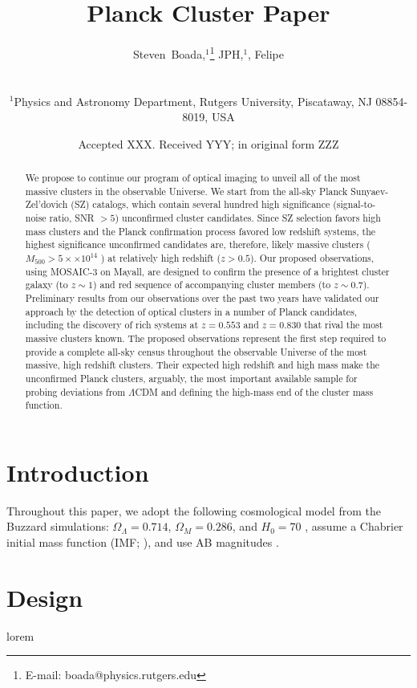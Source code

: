 \documentclass[fleqn,usenatbib]{mnras}
\title[Planck Cluster Paper]{Planck Cluster Paper}
\author[S. Boada et al.]
{\parbox{\textwidth}{Steven~Boada,$^{1}$\thanks{E-mail: boada@physics.rutgers.edu}
JPH,$^{1}$, Felipe
}\vspace{0.4cm}\
\\
\parbox{\textwidth}{$^{1}$Physics and Astronomy Department, Rutgers University, Piscataway, NJ 08854-8019, USA}}
\date{Accepted XXX. Received YYY; in original form ZZZ}
\begin{document}
\label{firstpage}
\pagerange{
\pageref{firstpage}--
\pageref{lastpage}}
\maketitle

\begin{abstract}
	\noindent We propose to continue our program of optical imaging to unveil all of the most massive clusters in
	the observable Universe. We start from the all-sky Planck Sunyaev-Zel’dovich (SZ) catalogs, which
	contain several hundred high significance (signal-to-noise ratio, SNR $> 5$) unconfirmed cluster
	candidates. Since SZ selection favors high mass clusters and the Planck confirmation process favored
	low redshift systems, the highest significance unconfirmed candidates are, therefore, likely massive
	clusters ($M_{500} > 5 ×\times 10^{14}$ \Msol) at relatively high redshift ($z > 0.5$). Our proposed observations,
	using MOSAIC-3 on Mayall, are designed to confirm the presence of a brightest cluster galaxy (to
	$z \sim 1$) and red sequence of accompanying cluster members (to $z \sim 0.7$). Preliminary results from
	our observations over the past two years have validated our approach by the detection of optical
	clusters in a number of Planck candidates, including the discovery of rich systems at $z = 0.553$ and
	$z = 0.830$ that rival the most massive clusters known. The proposed observations represent the first
	step required to provide a complete all-sky census throughout the observable Universe of the most
	massive, high redshift clusters. Their expected high redshift and high mass make the unconfirmed
	Planck clusters, arguably, the most important available sample for probing deviations from $\Lambda$CDM
	and defining the high-mass end of the cluster mass function.
\end{abstract}

\section{Introduction}
Throughout this paper, we adopt the following cosmological model from the Buzzard simulations: $\Omega_\Lambda = 0.714$, $\Omega_M = 0.286$, and $H_0= 70$ \kms \mpc, assume a Chabrier initial mass function (IMF; \citealt{Chabrier2003}), and use AB magnitudes \citep{Oke1974}.

\section{Design}\label{sec:design}
lorem
\end{document}
